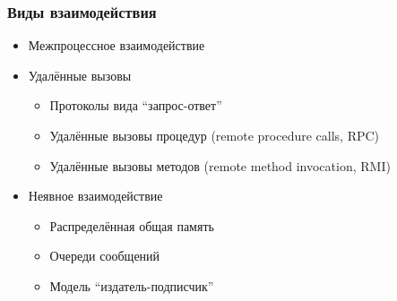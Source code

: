 \documentclass{../../slides-style}
\begin{document}
    \begin{frame}
        \frametitle{Виды взаимодействия}
        \begin{itemize}
            \item Межпроцессное взаимодействие
            \item Удалённые вызовы
            \begin{itemize}
                \item Протоколы вида ``запрос-ответ''
                \item Удалённые вызовы процедур (remote procedure calls, RPC)
                \item Удалённые вызовы методов (remote method invocation, RMI)
            \end{itemize}
            \item Неявное взаимодействие
            \begin{itemize}
                \item Распределённая общая память
                \item Очереди сообщений
                \item Модель ``издатель-подписчик''
            \end{itemize}
        \end{itemize}
    \end{frame}
\end{document}
